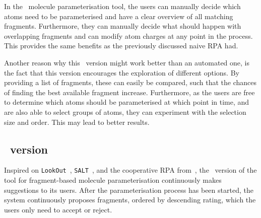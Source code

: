 In the \IDa\ molecule parameterisation tool, the users can manually decide which atoms need to be parameterised and have a clear overview of all matching fragments. Furthermore, they can manually decide what should happen with overlapping fragments and can modify atom charges at any point in the process. This provides the same benefits as the previously discussed naive RPA had.

Another reason why this \IDa\ version might work better than an automated one, is the fact that this version encourages the exploration of different options. By providing a list of fragments, these can easily be compared, such that the chances of finding the best available fragment increase. Furthermore, as the users are free to determine which atoms should be parameterised at which point in time, and are also able to select groups of atoms, they can experiment with the selection size and order. This may lead to better results.


\subsection{\IDB\ version}
Inspired on \verb|LookOut|~\cite{horvitz1999principles}, \verb|SALT|~\cite{marcus1987taking}, and the cooperative RPA from~\cite{payne2000varying}, the \IDb\ version of the tool for fragment-based molecule parameterisation continuously makes suggestions to its users. After the parameterisation process has been started, the system continuously proposes fragments, ordered by descending rating, which the users only need to accept or reject.

